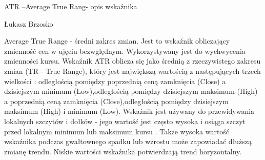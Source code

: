 \documentclass[12pt,a4paper]{article}
\begin{document}
\begin{center}
\begin{large}
ATR --Average True Rang-  opis wskaźnika  \\
\end{large}
Łukasz Brzosko
\end{center}

Average True Range - średni zakres zmian. Jest to wskaźnik obliczający zmienność cen w ujęciu bezwględnym.  Wykorzystywany jest do wychwycenia zmienności kursu. Wskaźnik ATR oblicza się jako średnią z rzeczywistego zakresu zmian (TR - True Range), który jest największą wartością z następujących trzech wielkości : odległością pomiędzy poprzednią ceną zamknięcia (Close) a dzisiejszym minimum (Low),odległością pomiędzy dzisiejszym maksimum (High) a poprzednią ceną zamknięcia (Close),odległością pomiędzy dzisiejszym maksimum (High) i minimum (Low). Wskaźnik jest używany do przewidywania lokalnych szczytów i dołków - jego wartość jest często wysoka i osiąga szczyt przed lokalnym minimum lub maksimum kursu . Także wysoka wartość wskaźnika podczas gwałtownego spadku lub wzrostu może zapowiadać dłuższą zmianę trendu. Niskie wartości wskaźnika potwierdzają trend horyzontalny.



\noindent
\end{document}
